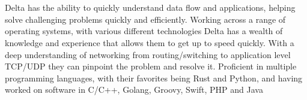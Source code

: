 \documentclass[11pt,letterpaper,sans]{moderncv}        %
\begin{document}
\makecvtitle
\vspace*{-5.5em} %
\section{}
Delta has the ability to quickly understand data flow and applications, helping solve challenging problems quickly and efficiently. Working across a range of operating systems, with various different technologies Delta has a wealth of knowledge and experience that allows them to get up to speed quickly. With a deep understanding of networking from routing/switching to application level TCP/UDP they can pinpoint the problem and resolve it. Proficient in multiple programming languages, with their favorites being Rust and Python, and having worked on software in C/C++, Golang, Groovy, Swift, PHP and Java
\end{document}
